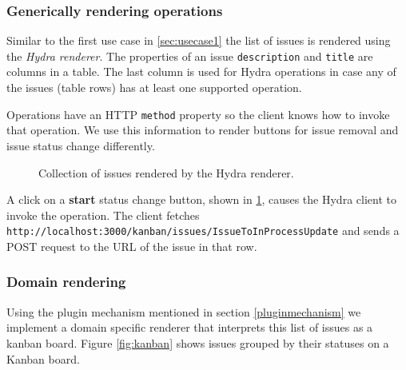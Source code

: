 \subsubsection{Generically rendering operations}
Similar to the first use case in \ref{sec:usecase1} the list of issues is rendered using the \textit{Hydra renderer}. The properties of an issue \lstinline{description} and \lstinline{title} are columns in a table. The last column is used for Hydra operations in case any of the issues (table rows) has at least one supported operation.

Operations have an HTTP \lstinline{method} property so the client knows how to invoke that operation. We use this information to render buttons for issue removal and issue status change differently.

\begin{figure}[!htb]
  \caption{Collection of issues rendered by the Hydra renderer.}
  \label{fig:issueshydra}
\end{figure}

A click on a \textbf{start} status change button, shown in \ref{fig:issueshydra}, causes the Hydra client to invoke the operation. The client fetches \lstinline{http://localhost:3000/kanban/issues/IssueToInProcessUpdate} and sends a POST request to the URL of the issue in that row.

\subsubsection{Domain rendering}
Using the plugin mechanism mentioned in section \ref{pluginmechanism} we implement a domain specific renderer that interprets this list of issues as a \gls{kanban} board. Figure \ref{fig:kanban} shows issues grouped by their statuses on a Kanban board.

